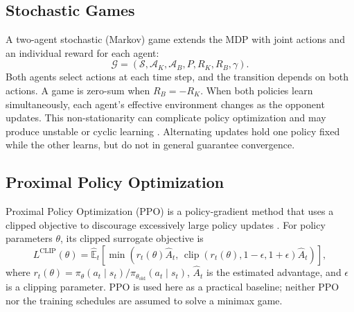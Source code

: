 \documentclass{article}
\begin{document}
\subsection{Stochastic Games}
A two-agent stochastic (Markov) game extends the MDP with joint actions and an individual reward for each agent:
\begin{equation}
\mathcal{G}=(\mathcal{S},\mathcal{A}_K,\mathcal{A}_B,P,R_K,R_B,\gamma).
\end{equation}
Both agents select actions at each time step, and the transition depends on both actions. A game is zero-sum when $R_B=-R_K$. When both policies learn simultaneously, each agent's effective environment changes as the opponent updates. This non-stationarity can complicate policy optimization and may produce unstable or cyclic learning \cite{busoniu2008comprehensive,hernandez2020survey}. Alternating updates hold one policy fixed while the other learns, but do not in general guarantee convergence.

\subsection{Proximal Policy Optimization}
Proximal Policy Optimization (PPO) is a policy-gradient method that uses a clipped objective to discourage excessively large policy updates \cite{schulman2017proximal}. For policy parameters $\theta$, its clipped surrogate objective is
\begin{equation}
L^{\mathrm{CLIP}}(\theta)=
\hat{\mathbb{E}}_t\left[
\min\left(
r_t(\theta)\hat{A}_t,\,
\operatorname{clip}(r_t(\theta),1-\epsilon,1+\epsilon)\hat{A}_t
\right)\right],
\end{equation}
where $r_t(\theta)=\pi_\theta(a_t\mid s_t)/\pi_{\theta_{\mathrm{old}}}(a_t\mid s_t)$, $\hat{A}_t$ is the estimated advantage, and $\epsilon$ is a clipping parameter. PPO is used here as a practical baseline; neither PPO nor the training schedules are assumed to solve a minimax game.
\end{document}
